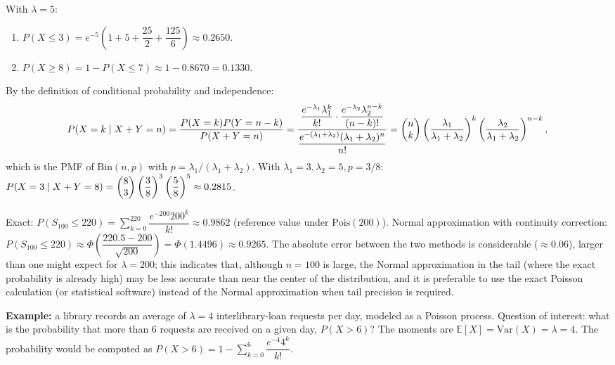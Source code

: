 \begin{solproblema}[prob:8fd3390]
	With $\lambda=5$:
	\begin{enumerate}
		\item $P(X\le3) = e^{-5}\left(1+5+\dfrac{25}{2}+\dfrac{125}{6}\right) \approx 0.2650$.
		\item $P(X\ge8) = 1-P(X\le7) \approx 1-0.8670 = 0.1330$.
	\end{enumerate}
\end{solproblema}

\begin{solproblema}
	By the definition of conditional probability and independence:
	\begin{align*}
		P(X=k\mid X+Y=n) = \dfrac{P(X=k)P(Y=n-k)}{P(X+Y=n)} = \dfrac{\dfrac{e^{-\lambda_1}\lambda_1^k}{k!}\cdot\dfrac{e^{-\lambda_2}\lambda_2^{n-k}}{(n-k)!}}{\dfrac{e^{-(\lambda_1+\lambda_2)}(\lambda_1+\lambda_2)^n}{n!}} = \begin{pmatrix} n \\ k\end{pmatrix}\left(\dfrac{\lambda_1}{\lambda_1+\lambda_2}\right)^k\left(\dfrac{\lambda_2}{\lambda_1+\lambda_2}\right)^{n-k},
	\end{align*}
	which is the PMF of $\text{Bin}(n,p)$ with $p=\lambda_1/(\lambda_1+\lambda_2)$. With $\lambda_1=3,\lambda_2=5,p=3/8$: $P(X=3\mid X+Y=8) = \begin{pmatrix} 8 \\ 3\end{pmatrix}\left(\dfrac{3}{8}\right)^3\left(\dfrac{5}{8}\right)^5 \approx 0.2815$.
\end{solproblema}

\begin{solproblema}[prob:5e9408a]
	Exact: $P(S_{100}\le220) = \sum_{k=0}^{220}\dfrac{e^{-200}200^k}{k!} \approx 0.9862$ (reference value under $\text{Pois}(200)$). Normal approximation with continuity correction: $P(S_{100}\le220) \approx \Phi\!\left(\dfrac{220.5-200}{\sqrt{200}}\right) = \Phi(1.4496) \approx 0.9265$. The absolute error between the two methods is considerable ($\approx0.06$), larger than one might expect for $\lambda=200$; this indicates that, although $n=100$ is large, the Normal approximation in the tail (where the exact probability is already high) may be less accurate than near the center of the distribution, and it is preferable to use the exact Poisson calculation (or statistical software) instead of the Normal approximation when tail precision is required.
\end{solproblema}

\begin{solproblema}[prob:9dc367e]
	\textbf{Example:} a library records an average of $\lambda=4$ interlibrary-loan requests per day, modeled as a Poisson process. Question of interest: what is the probability that more than $6$ requests are received on a given day, $P(X>6)$? The moments are $\mathbb{E}[X]=\text{Var}(X)=\lambda=4$. The probability would be computed as $P(X>6) = 1-\sum_{k=0}^{6}\dfrac{e^{-4}4^k}{k!}$.
\end{solproblema}
